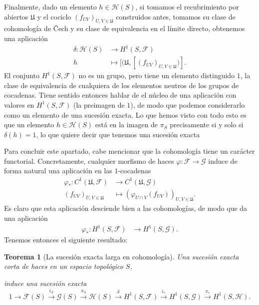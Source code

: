 \documentclass[autocontact]{gaceta}
\newtheorem{thm}{Teorema}[section]
\theoremstyle{definition} \newtheorem{defn}[thm]{Definición}
\theoremstyle{definition} \newtheorem{ejemplo}[thm]{Ejemplo}
\theoremstyle{definition} \newtheorem{ejercicio}[thm]{Ejercicio}
\def\FF{\mathscr{F}}
\def\GG{\mathscr{G}}
\def\HH{\mathscr{H}}
\def\UU{\mathfrak{U}}
\begin{document}
	    Finalmente, dado un elemento $h\in \HH(S)$, si tomamos el recubrimiento por abiertos $\UU$ y el cociclo $(f_{UV})_{U,V \in \UU}$ construidos antes, tomamos su clase de cohomología de \v{C}ech y su clase de equivalencia en el límite directo, obtenemos una aplicación
	    \begin{align*}
	      \delta :\HH(S) &\longrightarrow H^1(S,\FF)\\ 
	      h &\longmapsto [(\UU,[(f_{UV})_{U,V \in \UU})] .
	      \end{align*}
	      El conjunto $H^1(S,\FF)$ no es un grupo, pero tiene un elemento distinguido $1$, la clase de equivalencia de cualquiera de los elementos neutros de los grupos de cocadenas. Tiene sentido entonces hablar de el núcleo de una aplicación con valores en $H^1(S,\FF)$ (la preimagen de $1$), de modo que podemos considerarlo como un elemento de una sucesión exacta. Lo que hemos visto con todo esto es que un elemento $h\in \HH(S)$ está en la imagen de $\pi_S$ precisamente si y solo si $\delta(h)=1$, lo que quiere decir que tenemos una sucesión exacta
	      \begin{center}
	      \end{center}

	      Para concluir este apartado, cabe mencionar que la cohomología tiene un carácter functorial. Concretamente, cualquier morfismo de haces $\varphi:\FF \rightarrow \GG$ induce de forma natural una aplicación en las $1$-cocadenas
	      \begin{align*}
		\varphi_* :C^1(\UU,\FF) &\longrightarrow C^1(\UU,\GG)\\ 
		(f_{UV})_{U,V\in \UU} &\longmapsto (\varphi_{U\cap V}(f_{UV}) )_{U,V \in \UU}. 
		\end{align*}
		Es claro que esta aplicación desciende bien a las cohomologías, de modo que da una aplicación
		\begin{align*}
		   \varphi_*:H^1(S,\FF) &\longrightarrow H^1(S,\GG).
		  \end{align*}
		  Tenemos entonces el siguiente resultado:

		  \begin{thm}[La sucesión exacta larga en cohomología]
  Una sucesión exacta corta de haces en un espacio topológico $S$,
  \begin{center}
  \end{center}
  induce una sucesión exacta
  $$
  1 \rightarrow \FF(S) \overset{i_S}{\rightarrow} \GG(S) \overset{\pi_S}{\rightarrow}  \HH(S) \overset{\delta}{\rightarrow} H^1(S,\FF) \overset{i_*}{\rightarrow} H^1(S,\GG) \overset{\pi_*}{\rightarrow}  H^1(S,\HH).
      $$
\end{thm}
\end{document}

